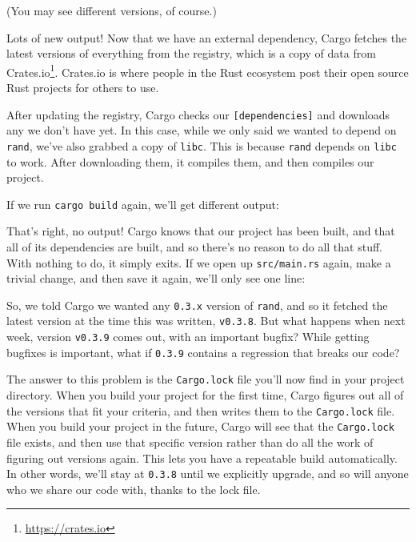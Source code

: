 \documentclass[a4paper,]{book}
\newenvironment{Shaded}{\begin{snugshade}}{\end{snugshade}}
\newcommand{\KeywordTok}[1]{\textcolor[rgb]{0.13,0.29,0.53}{\textbf{{#1}}}}
\newcommand{\NormalTok}[1]{{#1}}
\renewcommand{\href}[2]{#2\footnote{\url{#1}}}
\begin{document}
(You may see different versions, of course.)

Lots of new output! Now that we have an external dependency, Cargo
fetches the latest versions of everything from the registry, which is a
copy of data from \href{https://crates.io}{Crates.io}. Crates.io is
where people in the Rust ecosystem post their open source Rust projects
for others to use.

After updating the registry, Cargo checks our
\texttt{{[}dependencies{]}} and downloads any we don't have yet. In this
case, while we only said we wanted to depend on \texttt{rand}, we've
also grabbed a copy of \texttt{libc}. This is because \texttt{rand}
depends on \texttt{libc} to work. After downloading them, it compiles
them, and then compiles our project.

If we run \texttt{cargo\ build} again, we'll get different output:

\begin{Shaded}
\end{Shaded}

That's right, no output! Cargo knows that our project has been built,
and that all of its dependencies are built, and so there's no reason to
do all that stuff. With nothing to do, it simply exits. If we open up
\texttt{src/main.rs} again, make a trivial change, and then save it
again, we'll only see one line:

\begin{Shaded}
\end{Shaded}

So, we told Cargo we wanted any \texttt{0.3.x} version of \texttt{rand},
and so it fetched the latest version at the time this was written,
\texttt{v0.3.8}. But what happens when next week, version
\texttt{v0.3.9} comes out, with an important bugfix? While getting
bugfixes is important, what if \texttt{0.3.9} contains a regression that
breaks our code?

The answer to this problem is the \texttt{Cargo.lock} file you'll now
find in your project directory. When you build your project for the
first time, Cargo figures out all of the versions that fit your
criteria, and then writes them to the \texttt{Cargo.lock} file. When you
build your project in the future, Cargo will see that the
\texttt{Cargo.lock} file exists, and then use that specific version
rather than do all the work of figuring out versions again. This lets
you have a repeatable build automatically. In other words, we'll stay at
\texttt{0.3.8} until we explicitly upgrade, and so will anyone who we
share our code with, thanks to the lock file.
\end{document}

